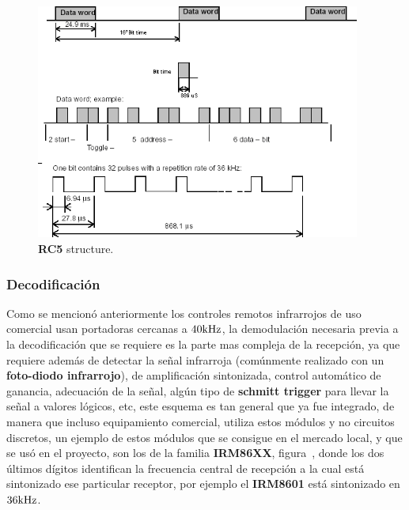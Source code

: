 \begin{figure}[H]
	\centering
	\includegraphics[width=0.95\textwidth]{img/IR/RC5_strctucture.png}
	\caption{\footnotesize{\textbf{RC5} structure.}}
	\label{fig:code_repetition_RC5}
\end{figure}


\subsubsection{Decodificación}

Como se mencionó anteriormente los controles remotos infrarrojos de uso comercial usan portadoras cercanas a $40 \si[per-mode=symbol]{\kilo\hertz}$, la demodulación necesaria previa a la decodificación que se requiere es la parte mas compleja de la recepción, ya que requiere además de detectar la señal infrarroja (comúnmente realizado con un \textbf{foto-diodo infrarrojo}), de amplificación sintonizada, control automático de ganancia, adecuación de la señal, algún tipo de \textbf{schmitt trigger} para llevar la señal a valores lógicos, etc, este esquema es tan general que ya fue integrado, de manera que incluso equipamiento comercial, utiliza estos módulos y no circuitos discretos, un ejemplo de estos módulos que se consigue en el mercado local, y que se usó en el proyecto, son los de la familia \textbf{IRM86XX}, figura~, donde los dos últimos dígitos identifican la frecuencia central de recepción a la cual está sintonizado ese particular receptor, por ejemplo el \textbf{IRM8601} está sintonizado en $36 \si[per-mode=symbol]{\kilo\hertz}$.


